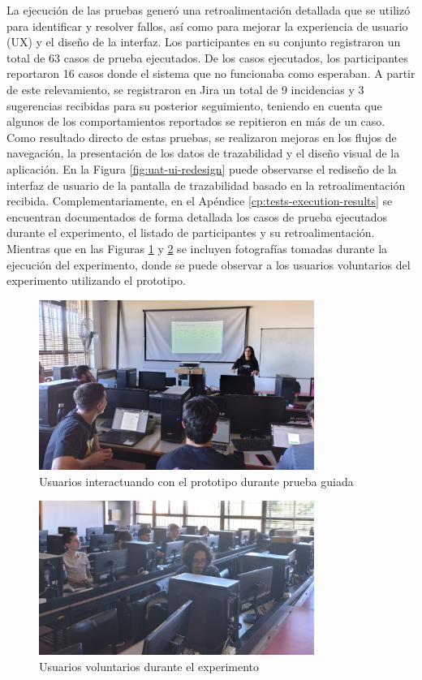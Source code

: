 La ejecución de las pruebas generó una retroalimentación detallada que se utilizó para identificar y resolver fallos, así como para mejorar la experiencia de usuario (UX) y el diseño de la interfaz. Los participantes en su conjunto registraron un total de 63 casos de prueba ejecutados. De los casos ejecutados, los participantes reportaron 16 casos donde el sistema que no funcionaba como esperaban.
A partir de este relevamiento, se registraron en Jira un total de 9 incidencias y 3 sugerencias recibidas para su posterior seguimiento, teniendo en cuenta que algunos de los comportamientos reportados se repitieron en más de un caso. Como resultado directo de estas pruebas, se realizaron mejoras en los flujos de navegación, la presentación de los datos de trazabilidad y el diseño visual de la aplicación. En la Figura \ref{fig:uat-ui-redesign} puede observarse el rediseño de la interfaz de usuario de la pantalla de trazabilidad basado en la retroalimentación recibida. Complementariamente, en el Apéndice \ref{cp:tests-execution-results} se encuentran documentados de forma detallada los casos de prueba ejecutados durante el experimento, el listado de participantes y su retroalimentación. Mientras que en las Figuras \ref{fig:uat-picture-1} y \ref{fig:uat-picture-2} se incluyen fotografías tomadas durante la ejecución del experimento, donde se puede observar a los usuarios voluntarios del experimento utilizando el prototipo.

\begin{figure}[!htb]
\centering
\includegraphics[width=0.8\textwidth]{Figures/uat-1.jpg}
\caption{Usuarios interactuando con el prototipo durante prueba guiada}
\label{fig:uat-picture-1}
\end{figure}

\begin{figure}[!htb]
\centering
\includegraphics[width=0.8\textwidth]{Figures/uat-2.jpg}
\caption{Usuarios voluntarios durante el experimento}
\label{fig:uat-picture-2}
\end{figure}

